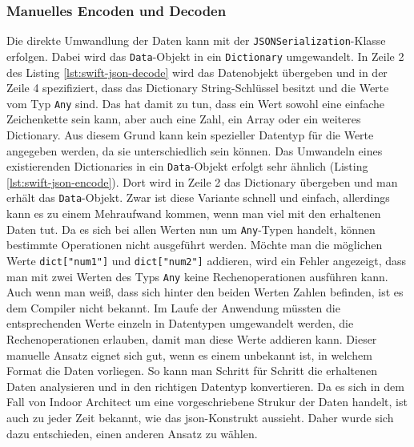 \subsubsection{Manuelles Encoden und Decoden}
Die direkte Umwandlung der Daten kann mit der \texttt{JSONSerialization}-Klasse erfolgen.
Dabei wird das \texttt{Data}-Objekt in ein \texttt{Dictionary} umgewandelt.
In Zeile 2 des Listing \ref{lst:swift-json-decode} wird das Datenobjekt übergeben und in der Zeile 4 spezifiziert, dass das Dictionary String-Schlüssel besitzt und die Werte vom Typ \texttt{Any} sind.
Das hat damit zu tun, dass ein Wert sowohl eine einfache Zeichenkette sein kann, aber auch eine Zahl, ein Array oder ein weiteres Dictionary.
Aus diesem Grund kann kein spezieller Datentyp für die Werte angegeben werden, da sie unterschiedlich sein können.
Das Umwandeln eines existierenden Dictionaries in ein \texttt{Data}-Objekt erfolgt sehr ähnlich (Listing \ref{lst:swift-json-encode}).
Dort wird in Zeile 2 das Dictionary übergeben und man erhält das \texttt{Data}-Objekt.\pbreak%
%
Zwar ist diese Variante schnell und einfach, allerdings kann es zu einem Mehraufwand kommen, wenn man viel mit den erhaltenen Daten tut.
Da es sich bei allen Werten nun um \texttt{Any}-Typen handelt, können bestimmte Operationen nicht ausgeführt werden.
Möchte man die möglichen Werte \texttt{dict["num1"]} und \texttt{dict["num2"]} addieren, wird ein Fehler angezeigt, dass man mit zwei Werten des Typs \texttt{Any} keine Rechenoperationen ausführen kann.
Auch wenn man weiß, dass sich hinter den beiden Werten Zahlen befinden, ist es dem Compiler nicht bekannt.
Im Laufe der Anwendung müssten die entsprechenden Werte einzeln in Datentypen umgewandelt werden, die Rechenoperationen erlauben, damit man diese Werte addieren kann.\pbreak%
%
Dieser manuelle Ansatz eignet sich gut, wenn es einem unbekannt ist, in welchem Format die Daten vorliegen.
So kann man Schritt für Schritt die erhaltenen Daten analysieren und in den richtigen Datentyp konvertieren.
Da es sich in dem Fall von Indoor Architect um eine vorgeschriebene Strukur der Daten handelt, ist auch zu jeder Zeit bekannt, wie das \ac{json}-Konstrukt aussieht.
Daher wurde sich dazu entschieden, einen anderen Ansatz zu wählen.
